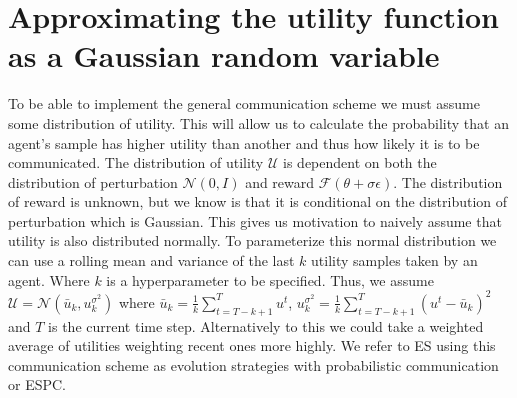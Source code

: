 

\section{Approximating the utility function as a Gaussian random variable}
\label{sec:GaussianScheme}

To be able to implement the general communication scheme we must assume some distribution of utility. This will allow us to calculate the probability that an agent's sample has higher utility than another and thus how likely it is to be communicated. The distribution of utility $\mathcal{U}$ is dependent on both the distribution of perturbation $\mathcal{N}(0,I)$ and reward $\mathcal{F}(\theta +\sigma \epsilon)$. The distribution of reward is unknown, but we know is that it is conditional on the distribution of perturbation which is Gaussian. This gives us motivation to naively assume that utility is also distributed normally. To parameterize this normal distribution we can use a rolling mean and variance of the last $k$ utility samples taken by an agent. Where $k$ is a hyperparameter to be specified. Thus, we assume $\mathcal{U} = \mathcal{N}(\bar{u}_k, u^{\sigma^2}_k)$ where $\bar{u}_k = \frac{1}{k} \sum_{t=T-k+1}^T u^t$, $u^{\sigma^2}_k = \frac{1}{k}\sum_{t=T-k+1}^T (u^t - \bar{u}_k)^2$ and $T$ is the current time step. Alternatively to this we could take a weighted average of utilities weighting recent ones more highly. We refer to ES using this communication scheme as evolution strategies with probabilistic communication or ESPC.

